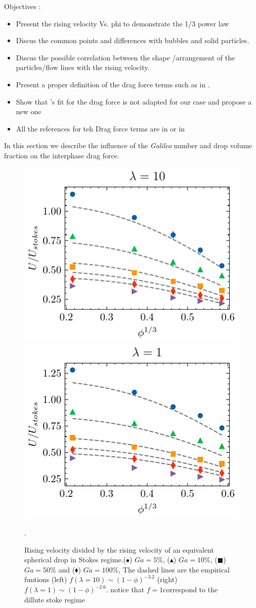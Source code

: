 Objectives : 
\begin{itemize}
    \item Present the rising velocity Vs. phi to demonstrate the 1/3 power law \citep{loisy2017buoyancy}
    \item Discus the common points and differences with bubbles and solid particles. 
    \item Discus the possible correlation between the shape /arrangement of the particles/flow lines with the rising velocity. 
    \item Present a proper definition of the drag force terms such as in \citet{wang2021numerical}. 
    \item Show that \citet{rusche2000effect}'s fit for the drag force is not adapted for our case and propose a new one
    \item All the references for teh Drag force terms are in \citet[chap 8]{morel2015mathematical} or in \citet{ishii2010thermo}
\end{itemize}
In this section we describe the influence of the \textit{Galileo} number and drop volume fraction on the interphase drag force. 

\begin{figure}[h!]
    \centering
    \includegraphics[height = 0.35\textwidth]{image/HOMOGENEOUS/fCA/UstokesGa_mu_r_0-1.pdf}
    \includegraphics[height = 0.35\textwidth]{image/HOMOGENEOUS/fCA/UstokesGa_mu_r_1-0.pdf}
    \caption{Rising velocity divided by the rising velocity of an equivalent spherical drop in Stokes regime.($\bullet$) $Ga = 5\%$, ($\blacktriangle$) $Ga = 10\%$, ($\blacksquare$) $Ga = 50\%$ and ($\blacklozenge$) $Ga = 100\%$, 
    The dashed lines are the empirical funtions (left) $f(\lambda = 10) \sim (1 - \phi)^{-3.2}$
    (right) $f(\lambda = 1) \sim (1 - \phi)^{-2.6}$. notice that $f = 1 $correspond to the dillute stoke regime }. 
\end{figure}
    

